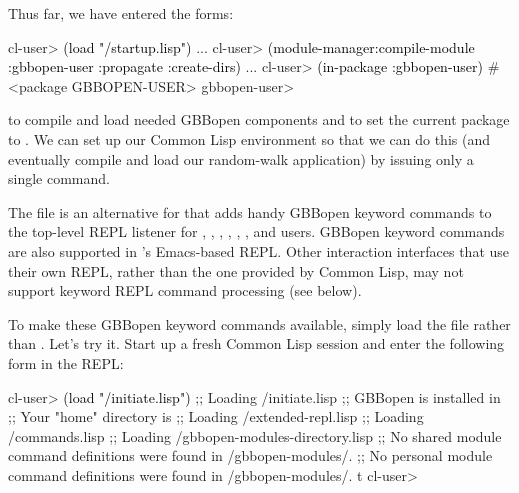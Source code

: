 \documentclass[10pt,twoside,english,pdftex]{article}
\begin{document}
Thus far, we have entered the forms:
%
\W\supp
\begin{example}
\textcolor{darkergray}{%
  cl-user> \textcolor{black}{(load "/startup.lisp")}
     ...
  cl-user> \textcolor{black}{(module-manager:compile-module :gbbopen-user :propagate :create-dirs)}
     ...
  cl-user> \textcolor{black}{(in-package :gbbopen-user)}
  #<package GBBOPEN-USER>
  gbbopen-user>}
\end{example}
%
to compile and load needed GBBopen components and to set the current package
to .  We can set up our Common Lisp environment so
that we can do this (and eventually compile and load our random-walk
application) by issuing only a single command.

The file  is an alternative
for  that adds handy GBBopen
keyword commands to the top-level REPL listener for , ,
,
,
,
,
 and  users.  GBBopen keyword commands are also
supported in 's
Emacs-based REPL.  Other interaction interfaces that use their own REPL,
rather than the one provided by Common Lisp, may not support keyword REPL
command processing (see below).

To make these GBBopen keyword commands available, simply load the file
 rather than
.  Let's try it.  Start up a
fresh Common Lisp session and enter the following form in the REPL:
%
\W\supp\notpretop
\begin{example}
\textcolor{darkergray}{%
  cl-user> \textcolor{black}{(load "/initiate.lisp")}
  ;; Loading /initiate.lisp
  ;; GBBopen is installed in 
  ;; Your "home" directory is 
  ;;     Loading /extended-repl.lisp
  ;;     Loading /commands.lisp
  ;;     Loading /gbbopen-modules-directory.lisp
  ;; No shared module command definitions were found in /gbbopen-modules/.
  ;; No personal module command definitions were found in /gbbopen-modules/.
  t
  cl-user>}
\end{example}
\end{document}
